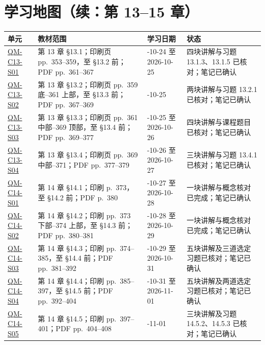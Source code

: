\clearpage
\section*{学习地图（续：第 13--15 章）}

\begin{center}
\footnotesize
\renewcommand{\arraystretch}{1.0}
\begin{tabularx}{\textwidth}{@{}>{\raggedright\arraybackslash}p{2.7cm}>{\raggedright\arraybackslash}p{4.1cm}>{\raggedright\arraybackslash}p{3.0cm}X@{}}
  \toprule
  单元 & 教材范围 & 学习日期 & 状态 \\
  \midrule
  \hyperref[section:QM-C13-S01]{QM-C13-S01} & 第 13 章 \S 13.1；印刷页 pp.~353--359，至 \S 13.2 前；PDF pp.~361--367 & 2026-10-24 至 2026-10-25 & 四块讲解与习题 13.1.3、13.1.5 已核对；笔记已确认 \\
  \hyperref[section:QM-C13-S02]{QM-C13-S02} & 第 13 章 \S 13.2；印刷页 pp.~359 底--361 上部，至 \S 13.3 前；PDF pp.~367--369 & 2026-10-25 & 两块讲解与习题 13.2.1 已核对；笔记已确认 \\
  \hyperref[section:QM-C13-S03]{QM-C13-S03} & 第 13 章 \S 13.3；印刷页 pp.~361 中部--369 顶部，至 \S 13.4 前；PDF pp.~369--377 & 2026-10-25 至 2026-10-26 & 四块讲解与课程题目已核对；笔记已确认 \\
  \hyperref[section:QM-C13-S04]{QM-C13-S04} & 第 13 章 \S 13.4；印刷页 pp.~369 中部--371；PDF pp.~377--379 & 2026-10-26 至 2026-10-27 & 三块讲解与习题 13.4.1 已核对；笔记已确认 \\
  \hyperref[section:QM-C14-S01]{QM-C14-S01} & 第 14 章 \S 14.1；印刷 p.~373，至 \S 14.2 前；PDF p.~380 & 2026-10-27 至 2026-10-28 & 一块讲解与概念核对已完成；笔记已确认 \\
  \hyperref[section:QM-C14-S02]{QM-C14-S02} & 第 14 章 \S 14.2；印刷 pp.~373 下部--374 上部，至 \S 14.3 前；PDF pp.~380--381 & 2026-10-28 至 2026-10-29 & 一块讲解与概念核对已完成；笔记已确认 \\
  \hyperref[section:QM-C14-S03]{QM-C14-S03} & 第 14 章 \S 14.3；印刷 pp.~374--385，至 \S 14.4 前；PDF pp.~381--392 & 2026-10-29 至 2026-10-31 & 五块讲解及三道选定习题已核对；笔记已确认 \\
  \hyperref[section:QM-C14-S04]{QM-C14-S04} & 第 14 章 \S 14.4；印刷 pp.~385--397，至 \S 14.5 前；PDF pp.~392--404 & 2026-10-31 至 2026-11-01 & 五块讲解及两道选定习题已核对；笔记已确认 \\
  \hyperref[section:QM-C14-S05]{QM-C14-S05} & 第 14 章 \S 14.5；印刷 pp.~397--401；PDF pp.~404--408 & 2026-11-01 & 三块讲解及习题 14.5.2、14.5.3 已核对；笔记已确认 \\

\end{tabularx}
\end{center}
